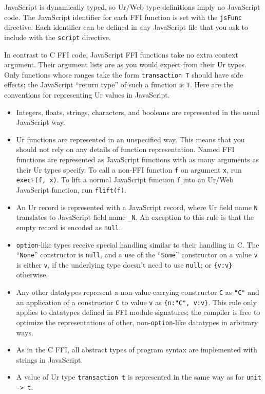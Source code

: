 \documentclass{article}
\newcommand{\cd}[1]{\texttt{#1}}
\begin{document}
JavaScript is dynamically typed, so Ur/Web type definitions imply no JavaScript code.  The JavaScript identifier for each FFI function is set with the \texttt{jsFunc} directive.  Each identifier can be defined in any JavaScript file that you ask to include with the \texttt{script} directive.

In contrast to C FFI code, JavaScript FFI functions take no extra context argument.  Their argument lists are as you would expect from their Ur types.  Only functions whose ranges take the form \texttt{transaction T} should have side effects; the JavaScript ``return type'' of such a function is \texttt{T}.  Here are the conventions for representing Ur values in JavaScript.

\begin{itemize}
\item Integers, floats, strings, characters, and booleans are represented in the usual JavaScript way.
\item Ur functions are represented in an unspecified way.  This means that you should not rely on any details of function representation.  Named FFI functions are represented as JavaScript functions with as many arguments as their Ur types specify.  To call a non-FFI function \texttt{f} on argument \texttt{x}, run \texttt{execF(f, x)}.  To lift a normal JavaScript function \cd{f} into an Ur/Web JavaScript function, run \cd{flift(f)}.
\item An Ur record is represented with a JavaScript record, where Ur field name \texttt{N} translates to JavaScript field name \texttt{\_N}.  An exception to this rule is that the empty record is encoded as \texttt{null}.
\item \texttt{option}-like types receive special handling similar to their handling in C.  The ``\texttt{None}'' constructor is \texttt{null}, and a use of the ``\texttt{Some}'' constructor on a value \texttt{v} is either \texttt{v}, if the underlying type doesn't need to use \texttt{null}; or \texttt{\{v:v\}} otherwise.
\item Any other datatypes represent a non-value-carrying constructor \texttt{C} as \texttt{"C"} and an application of a constructor \texttt{C} to value \texttt{v} as \texttt{\{n:"C", v:v\}}.  This rule only applies to datatypes defined in FFI module signatures; the compiler is free to optimize the representations of other, non-\texttt{option}-like datatypes in arbitrary ways.
\item As in the C FFI, all abstract types of program syntax are implemented with strings in JavaScript.
\item A value of Ur type \texttt{transaction t} is represented in the same way as for \texttt{unit -> t}.
\end{itemize}
\end{document}
